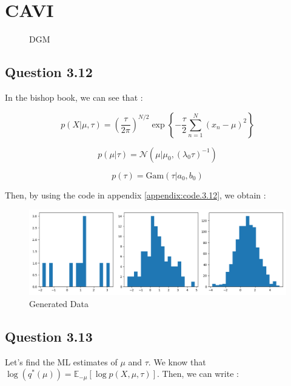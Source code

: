 \documentclass{article}
\begin{document}
\section{CAVI}

\begin{figure}[H]
    \centering
    
    \caption{DGM}
    \label{fig:fig3}
\end{figure}

\subsection*{Question 3.12}

In the bishop book, we can see that :

\begin{equation}
    p(X|\mu, \tau) = \left(\frac{\tau}{2\pi}\right)^{N/2} \exp\left\{-\frac{\tau}{2}\sum_{n=1}^{N}(x_n - \mu)^2\right\}
\end{equation}

\begin{equation}
    p(\mu|\tau) = \mathcal{N}(\mu|\mu_0, (\lambda_0 \tau)^{-1})
\end{equation}

\begin{equation}
    p(\tau) = \text{Gam}(\tau|a_0, b_0)
\end{equation}

Then, by using the code in appendix \ref{appendix:code.3.12}, we obtain :

\begin{figure}[H]
    \centering
    \includegraphics[scale=0.5]{images/12_data.png}
    \caption{Generated Data}
    \label{fig:3.12}
\end{figure}

\subsection*{Question 3.13}

Let's find the ML estimates of $\mu$ and $\tau$.
We know that $\log(q^*(\mu)) = \mathbb{E}_{-\mu}[\log p(X, \mu, \tau)]$.
Then, we can write :
\end{document}
